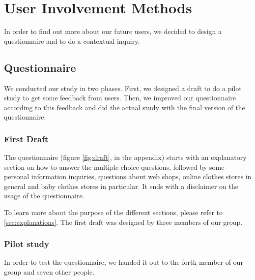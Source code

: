 \section{User Involvement Methods}
In order to find out more about our future users, we decided to design a questionnaire and to do a contextual inquiry. 

\subsection{Questionnaire}

We conducted our study in two phases. First, we designed a draft to do a pilot study to get some feedback from users. Then, we improved our questionnaire according to this feedback and did the actual study with the final version of the questionnaire.

\subsubsection{First Draft}
The questionnaire (figure \ref{fig:draft}, in the appendix) starts with an explanatory section on how to answer the multiple-choice questions, followed by some personal information inquiries, questions about web shops, online clothes stores in general and baby clothes stores in particular. It ends with a disclaimer on the usage of the questionnaire.

To learn more about the purpose of the different sections, please refer to \ref{sec:explanations}.
The first draft was designed by three members of our group.

\subsubsection{Pilot study}
In order to test the questionnaire, we handed it out to the forth member of our group 
and seven other people.

